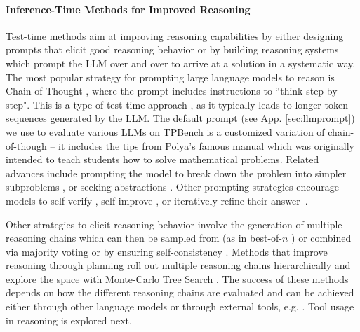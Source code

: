\paragraph{Inference-Time Methods for Improved Reasoning}
Test-time methods aim at improving reasoning capabilities by either designing prompts that elicit good reasoning behavior or by building reasoning systems which prompt the LLM over and over to arrive at a solution in a systematic way. The most popular strategy for prompting large language models to reason is Chain-of-Thought \citep{wei2023chainofthoughtpromptingelicitsreasoning}, where the prompt includes instructions to ``think step-by-step". This is a type of test-time approach \citep{snell2024scalingllmtesttimecompute,welleck2024decodingmetagenerationinferencetimealgorithms,muennighoff2025s1}, as it typically leads to longer token sequences generated by the LLM. The default prompt (see App. \ref{sec:llmprompt}) we use to evaluate various LLMs on TPBench is a customized variation of chain-of-though -- it includes the tips from Polya's famous manual  \citep{Polya1945} which was originally intended to teach students how to solve mathematical problems. Related advances include prompting the model to break down the problem into simpler subproblems \citep{khot2022decomposed,zhou2022least,hao2023reasoning}, or seeking abstractions \citep{zheng2023take}. Other prompting strategies encourage models to self-verify \citep{lightman2023letsverifystepstep,selfevaluation}, self-improve \citep{chen2024self, chen2024boosting}, or iteratively refine their answer~\citep{selfrefine,selfrefinereport}.

Other strategies to elicit reasoning behavior involve the generation of multiple reasoning chains which can then be sampled from (as in best-of-$n$ \cite{beirami2025theoreticalguaranteesbestofnalignment}) or combined via majority voting or by ensuring self-consistency \citep{selfconsistency}. Methods that improve reasoning through planning \citep{hao2023reasoning,yao2023tree, qi2024mutual,zhang2024llamaberrypairwiseoptimizationo1like,kang2024mindstar} roll out multiple reasoning chains hierarchically and explore the space with Monte-Carlo Tree Search \citep{kocsis2006bandit}. The success of these methods depends on how the different reasoning chains are evaluated and can be achieved either through other language models \citep{qi2024mutual} or through external tools, e.g. \citep{zhang2024llamaberrypairwiseoptimizationo1like}. Tool usage in reasoning is explored next.

